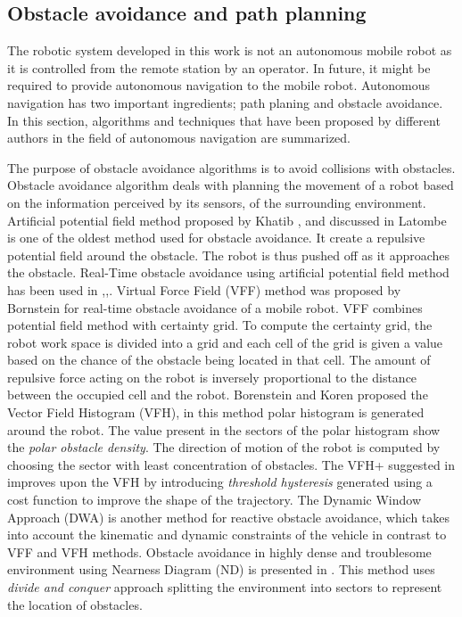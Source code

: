 \subsection{Obstacle avoidance and path planning}

The robotic system developed in this work is not an autonomous mobile robot as it is controlled from the remote station by an operator. In future, it might be required to provide autonomous navigation to the mobile robot. Autonomous navigation has two important  ingredients; path planing and obstacle avoidance. In this section, algorithms and techniques that have been proposed by different authors in the field of autonomous navigation are summarized. 

The purpose of obstacle avoidance algorithms is to avoid collisions with obstacles.  Obstacle avoidance algorithm deals with planning the movement of a robot based on the  information perceived by its sensors, of the surrounding environment. Artificial potential field method proposed by Khatib \cite{khatib1986real}, \cite{khatib1980commande} and discussed in Latombe \cite{latombe2012robot} is one of the oldest method used for obstacle avoidance. It create a repulsive potential field around the obstacle. The robot is thus pushed off as it approaches the obstacle.  Real-Time obstacle avoidance  using artificial potential field method has been used in \cite{khatib1986real},\cite{tang2010novel},\cite{park2001obstacle}. Virtual Force Field (VFF) method was proposed by Bornstein \cite{borenstein1989real} for  real-time obstacle avoidance of a mobile robot. VFF combines potential field method \cite{latombe2012robot} with certainty grid. To compute the certainty grid,  the robot work space is divided into a grid and each cell of the  grid is given a value based on the chance of  the obstacle being  located in that cell. The amount of repulsive force acting on the robot is inversely proportional to the distance between the occupied cell and the robot. Borenstein and Koren \cite{borenstein1991vector} proposed  the Vector Field Histogram (VFH), in this method polar histogram is generated  around the robot. The value present in the sectors of the polar histogram show the \textit{polar obstacle density}. The direction of motion of the robot is computed by choosing the sector with least concentration of obstacles. The VFH+ suggested in \cite{ulrich1998vfh+} improves upon the VFH  by introducing  \textit{threshold hysteresis} generated using a cost function to improve the shape of the trajectory. The Dynamic Window Approach (DWA) \cite{brock1999high} is another method for reactive obstacle avoidance, which takes into account the kinematic and dynamic constraints of the vehicle in contrast to VFF and VFH methods. Obstacle avoidance in highly dense and troublesome environment using Nearness Diagram (ND) is presented in \cite{minguez2004nearness}. This method uses \textit{divide and conquer} approach splitting the environment into sectors to represent the location of obstacles. 

